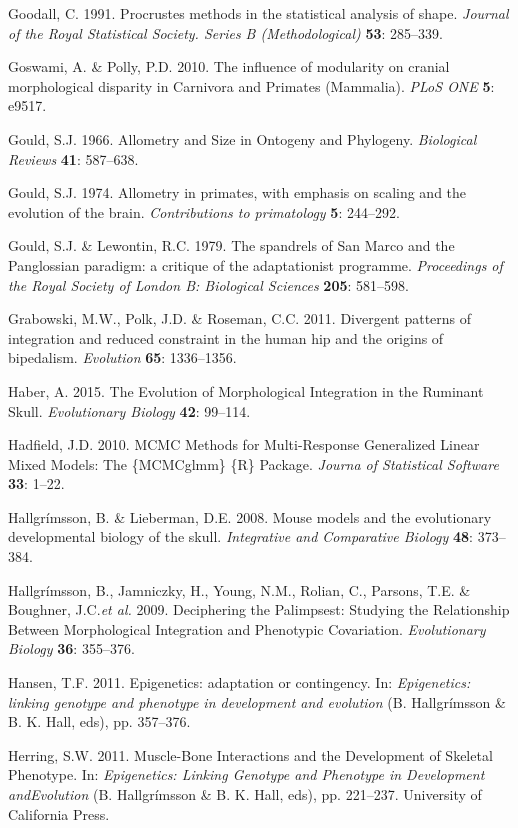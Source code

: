 \documentclass[12pt,twoside]{report}
\begin{document}
Goodall, C. 1991. Procrustes methods in the statistical analysis of
shape. \emph{Journal of the Royal Statistical Society. Series B
(Methodological)} \textbf{53}: 285--339.

Goswami, A. \& Polly, P.D. 2010. The influence of modularity on cranial
morphological disparity in Carnivora and Primates (Mammalia). \emph{PLoS
ONE} \textbf{5}: e9517.

Gould, S.J. 1966. Allometry and Size in Ontogeny and Phylogeny.
\emph{Biological Reviews} \textbf{41}: 587--638.

Gould, S.J. 1974. Allometry in primates, with emphasis on scaling and
the evolution of the brain. \emph{Contributions to primatology}
\textbf{5}: 244--292.

Gould, S.J. \& Lewontin, R.C. 1979. The spandrels of San Marco and the
Panglossian paradigm: a critique of the adaptationist programme.
\emph{Proceedings of the Royal Society of London B: Biological Sciences}
\textbf{205}: 581--598.

Grabowski, M.W., Polk, J.D. \& Roseman, C.C. 2011. Divergent patterns of
integration and reduced constraint in the human hip and the origins of
bipedalism. \emph{Evolution} \textbf{65}: 1336--1356.

Haber, A. 2015. The Evolution of Morphological Integration in the
Ruminant Skull. \emph{Evolutionary Biology} \textbf{42}: 99--114.

Hadfield, J.D. 2010. MCMC Methods for Multi-Response Generalized Linear
Mixed Models: The \{MCMCglmm\} \{R\} Package. \emph{Journa of
Statistical Software} \textbf{33}: 1--22.

Hallgrímsson, B. \& Lieberman, D.E. 2008. Mouse models and the
evolutionary developmental biology of the skull. \emph{Integrative and
Comparative Biology} \textbf{48}: 373--384.

Hallgrímsson, B., Jamniczky, H., Young, N.M., Rolian, C., Parsons, T.E.
\& Boughner, J.C.\emph{et al.} 2009. Deciphering the Palimpsest:
Studying the Relationship Between Morphological Integration and
Phenotypic Covariation. \emph{Evolutionary Biology} \textbf{36}:
355--376.

Hansen, T.F. 2011. Epigenetics: adaptation or contingency. In:
\emph{Epigenetics: linking genotype and phenotype in development and
evolution} (B. Hallgrímsson \& B. K. Hall, eds), pp. 357--376.

Herring, S.W. 2011. Muscle-Bone Interactions and the Development of
Skeletal Phenotype. In: \emph{Epigenetics: Linking Genotype and
Phenotype in Development andEvolution} (B. Hallgrímsson \& B. K. Hall,
eds), pp. 221--237. University of California Press.
\end{document}

